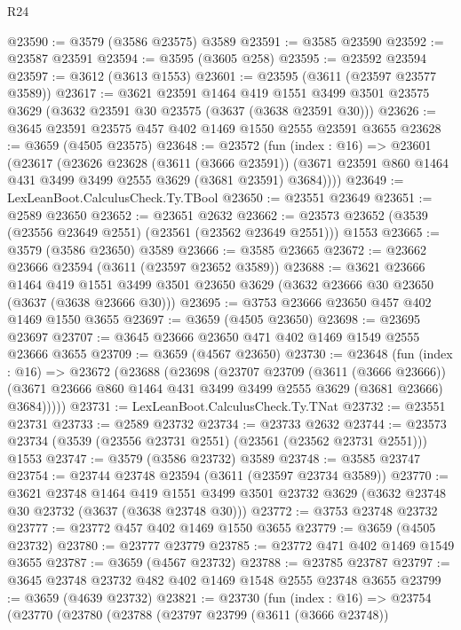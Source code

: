 \begin{lexlean}{R24}
\begin{coremodule}
@23590 := @3579 (@3586 @23575) @3589
@23591 := @3585 @23590
@23592 := @23587 @23591
@23594 := @3595 (@3605 @258)
@23595 := @23592 @23594
@23597 := @3612 (@3613 @1553)
@23601 := @23595 (@3611 (@23597 @23577 @3589))
@23617 := @3621
    @23591
    @1464
    @419
    @1551
    @3499
    @3501
    @23575
    @3629
    (@3632 @23591 @30 @23575 (@3637 (@3638 @23591 @30)))
@23626 := @3645 @23591 @23575 @457 @402 @1469 @1550 @2555 @23591 @3655
@23628 := @3659 (@4505 @23575)
@23648 := @23572
    (fun (index : @16) =>
    @23601
      (@23617
        (@23626
          @23628
          (@3611 (@3666 @23591))
          (@3671 @23591 @860 @1464 @431 @3499 @3499 @2555 @3629 (@3681 @23591) @3684))))
@23649 := LexLeanBoot.CalculusCheck.Ty.TBool
@23650 := @23551 @23649
@23651 := @2589 @23650
@23652 := @23651 @2632
@23662 := @23573 @23652 (@3539 (@23556 @23649 @2551) (@23561 (@23562 @23649 @2551))) @1553
@23665 := @3579 (@3586 @23650) @3589
@23666 := @3585 @23665
@23672 := @23662 @23666 @23594 (@3611 (@23597 @23652 @3589))
@23688 := @3621
    @23666
    @1464
    @419
    @1551
    @3499
    @3501
    @23650
    @3629
    (@3632 @23666 @30 @23650 (@3637 (@3638 @23666 @30)))
@23695 := @3753 @23666 @23650 @457 @402 @1469 @1550 @3655
@23697 := @3659 (@4505 @23650)
@23698 := @23695 @23697
@23707 := @3645 @23666 @23650 @471 @402 @1469 @1549 @2555 @23666 @3655
@23709 := @3659 (@4567 @23650)
@23730 := @23648
    (fun (index : @16) =>
    @23672
      (@23688
        (@23698
          (@23707
            @23709
            (@3611 (@3666 @23666))
            (@3671 @23666 @860 @1464 @431 @3499 @3499 @2555 @3629 (@3681 @23666) @3684)))))
@23731 := LexLeanBoot.CalculusCheck.Ty.TNat
@23732 := @23551 @23731
@23733 := @2589 @23732
@23734 := @23733 @2632
@23744 := @23573 @23734 (@3539 (@23556 @23731 @2551) (@23561 (@23562 @23731 @2551))) @1553
@23747 := @3579 (@3586 @23732) @3589
@23748 := @3585 @23747
@23754 := @23744 @23748 @23594 (@3611 (@23597 @23734 @3589))
@23770 := @3621
    @23748
    @1464
    @419
    @1551
    @3499
    @3501
    @23732
    @3629
    (@3632 @23748 @30 @23732 (@3637 (@3638 @23748 @30)))
@23772 := @3753 @23748 @23732
@23777 := @23772 @457 @402 @1469 @1550 @3655
@23779 := @3659 (@4505 @23732)
@23780 := @23777 @23779
@23785 := @23772 @471 @402 @1469 @1549 @3655
@23787 := @3659 (@4567 @23732)
@23788 := @23785 @23787
@23797 := @3645 @23748 @23732 @482 @402 @1469 @1548 @2555 @23748 @3655
@23799 := @3659 (@4639 @23732)
@23821 := @23730
    (fun (index : @16) =>
    @23754
      (@23770
        (@23780
          (@23788
            (@23797
              @23799
              (@3611 (@3666 @23748))

\end{coremodule}
\end{lexlean}
